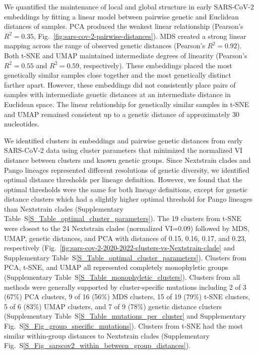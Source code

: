 \documentclass[webpdf,contemporary,large,single]{oup-authoring-template}%
\theoremstyle{thmstyleone}%
\theoremstyle{thmstyletwo}%
\theoremstyle{thmstylethree}%
\begin{document}
We quantified the maintenance of local and global structure in early SARS-CoV-2 embeddings by fitting a linear model between pairwise genetic and Euclidean distances of samples.
PCA produced the weakest linear relationship (Pearson's $R^{2}=0.35$, Fig.~\ref{fig:sars-cov-2-pairwise-distances}).
MDS created a strong linear mapping across the range of observed genetic distances (Pearson's $R^{2}=0.92$).
Both t-SNE and UMAP maintained intermediate degrees of linearity (Pearson's $R^{2}=0.55$ and $R^{2}=0.59$, respectively).
These embeddings placed the most genetically similar samples close together and the most genetically distinct farther apart.
However, these embeddings did not consistently place pairs of samples with intermediate genetic distances at an intermediate distance in Euclidean space.
The linear relationship for genetically similar samples in t-SNE and UMAP remained consistent up to a genetic distance of approximately 30 nucleotides.

We identified clusters in embeddings and pairwise genetic distances from early SARS-CoV-2 data using cluster parameters that minimized the normalized VI distance between clusters and known genetic groups.
Since Nextstrain clades and Pango lineages represented different resolutions of genetic diversity, we identified optimal distance thresholds per lineage definition.
However, we found that the optimal thresholds were the same for both lineage definitions, except for genetic distance clusters which had a slightly higher optimal threshold for Pango lineages than Nextstrain clades (Supplementary Table~S\ref{S_Table_optimal_cluster_parameters}).
The 19 clusters from t-SNE were closest to the 24 Nextstrain clades (normalized VI=0.09) followed by MDS, UMAP, genetic distances, and PCA with distances of 0.15, 0.16, 0.17, and 0.23, respectively (Fig.~\ref{fig:sars-cov-2-2020-2022-clusters-vs-Nextstrain-clade} and Supplementary Table~S\ref{S_Table_optimal_cluster_parameters}).
Clusters from PCA, t-SNE, and UMAP all represented completely monophyletic groups (Supplementary Table~S\ref{S_Table_monophyletic_clusters}).
Clusters from all methods were generally supported by cluster-specific mutations including 2 of 3 (67\%) PCA clusters, 9 of 16 (56\%) MDS clusters, 15 of 19 (79\%) t-SNE clusters, 5 of 6 (83\%) UMAP clusters, and 7 of 9 (78\%) genetic distance clusters (Supplementary Table~S\ref{S_Table_mutations_per_cluster} and Supplementary Fig.~S\ref{S_Fig_group_specific_mutations}).
Clusters from t-SNE had the most similar within-group distances to Nextstrain clades (Supplementary Fig.~S\ref{S_Fig_sarscov2_within_between_group_distances}).
\end{document}

